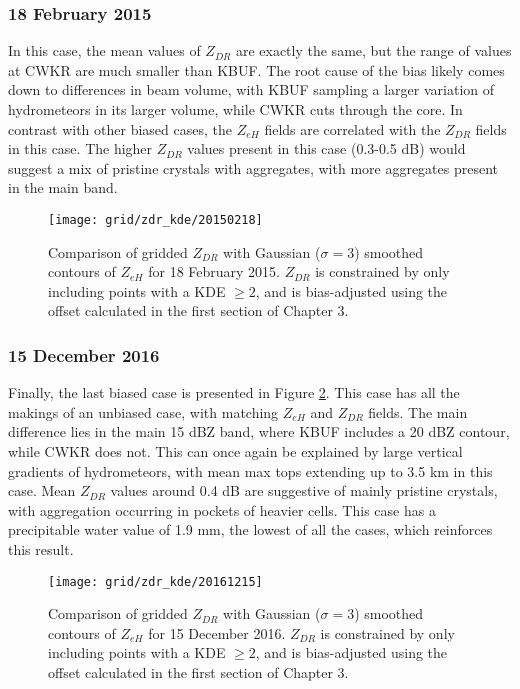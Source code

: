 \subsubsection{18 February 2015}
In this case, the mean values of $Z_{DR}$ are exactly the same, but the range of values at CWKR are much smaller than KBUF. The root cause of the bias likely comes down to differences in beam volume, with KBUF sampling a larger variation of hydrometeors in its larger volume, while CWKR cuts through the core. In contrast with other biased cases, the $Z_{eH}$ fields are correlated with the $Z_{DR}$ fields in this case. The higher $Z_{DR}$ values present in this case (0.3-0.5 dB) would suggest a mix of pristine crystals with aggregates, with more aggregates present in the main band. 
\begin{figure}[H]
\texttt{[image: grid/zdr\_kde/20150218]}
\caption{Comparison of gridded $Z_{DR}$ with Gaussian ($\sigma=3$) smoothed contours of $Z_{eH}$ for 18 February 2015. $Z_{DR}$ is constrained by only including points with a
KDE $\geq 2$, and is bias-adjusted using the offset calculated in the first section of Chapter 3.} 
\label{fig:grid_zdr_kde_20150218}
\end{figure}

\subsubsection{15 December 2016}
Finally, the last biased case is presented in Figure \ref{fig:grid_zdr_kde_20161215}. This case has all the makings of an unbiased case, with matching $Z_{eH}$ and $Z_{DR}$ fields. The main difference lies in the main 15 dBZ band, where KBUF includes a 20 dBZ contour, while CWKR does not. This can once again be explained by large vertical gradients of hydrometeors, with mean max tops extending up to 3.5 km in this case. Mean $Z_{DR}$ values around 0.4 dB are suggestive of mainly pristine crystals, with aggregation occurring in pockets of heavier cells. This case has a precipitable water value of 1.9 mm, the lowest of all the cases, which reinforces this result.
\begin{figure}[H]
\texttt{[image: grid/zdr\_kde/20161215]}
\caption{Comparison of gridded $Z_{DR}$ with Gaussian ($\sigma=3$) smoothed contours of $Z_{eH}$ for 15 December 2016. $Z_{DR}$ is constrained by only including points with a
KDE $\geq 2$, and is bias-adjusted using the offset calculated in the first section of Chapter 3.} 
\label{fig:grid_zdr_kde_20161215}
\end{figure}